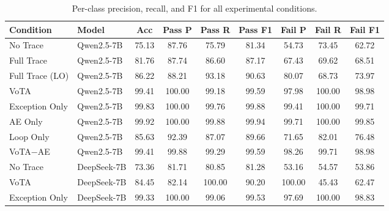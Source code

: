 \begin{table}[t]
\centering
\caption{Per-class precision, recall, and F1 for all experimental conditions.}
\label{tab:per-class}
\small
\begin{tabular}{llccccccc}
\toprule
\textbf{Condition} & \textbf{Model} & \textbf{Acc} & \textbf{Pass P} & \textbf{Pass R} & \textbf{Pass F1} & \textbf{Fail P} & \textbf{Fail R} & \textbf{Fail F1} \\
\midrule
No Trace          & Qwen2.5-7B & 75.13 & 87.76 & 75.79 & 81.34 & 54.73 & 73.45 & 62.72 \\
Full Trace        & Qwen2.5-7B & 81.76 & 87.74 & 86.60 & 87.17 & 67.43 & 69.62 & 68.51 \\
Full Trace (LO)   & Qwen2.5-7B & 86.22 & 88.21 & 93.18 & 90.63 & 80.07 & 68.73 & 73.97 \\
VoTA              & Qwen2.5-7B & 99.41 & 100.00 & 99.18 & 99.59 & 97.98 & 100.00 & 98.98 \\
Exception Only    & Qwen2.5-7B & 99.83 & 100.00 & 99.76 & 99.88 & 99.41 & 100.00 & 99.71 \\
AE Only           & Qwen2.5-7B & 99.92 & 100.00 & 99.88 & 99.94 & 99.71 & 100.00 & 99.85 \\
Loop Only         & Qwen2.5-7B & 85.63 & 92.39 & 87.07 & 89.66 & 71.65 & 82.01 & 76.48 \\
VoTA$-$AE         & Qwen2.5-7B & 99.41 & 99.88 & 99.29 & 99.59 & 98.26 & 99.71 & 98.98 \\
\midrule
No Trace          & DeepSeek-7B & 73.36 & 81.71 & 80.85 & 81.28 & 53.16 & 54.57 & 53.86 \\
VoTA              & DeepSeek-7B & 84.45 & 82.14 & 100.00 & 90.20 & 100.00 & 45.43 & 62.47 \\
Exception Only    & DeepSeek-7B & 99.33 & 100.00 & 99.06 & 99.53 & 97.69 & 100.00 & 98.83 \\
\bottomrule
\end{tabular}
\end{table}
